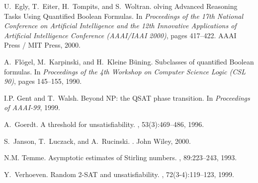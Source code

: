 \documentclass[aop,noinfoline]{imsart}
\begin{document}
\begin{thebibliography}{10}
U.~Egly, T.~Eiter, H.~Tompits, and S.~Woltran.
olving {A}dvanced {R}easoning {T}asks {U}sing {Q}uantified
  {B}oolean {F}ormulas.
\newblock In {\em Proceedings of the 17th National Conference on Artificial
  Intelligence and the 12th Innovative Applications of Artificial Intelligence
  Conference (AAAI/IAAI 2000)}, pages 417--422. AAAI Press / MIT Press, 2000.

A.~Fl{\"o}gel, M.~Karpinski, and H.~Kleine B{\"u}ning.
\newblock Subclasses of quantified {B}oolean formulas.
\newblock In {\em Proceedings of the 4th Workshop on Computer Science Logic
  (CSL 90)}, pages 145--155, 1990.

I.P. Gent and T.~Walsh.
\newblock Beyond {NP}: the {QSAT} phase transition.
\newblock In {\em Proceedings of AAAI-99}, 1999.

A.~Goerdt.
\newblock A threshold for unsatisfiability.
, 53(3):469--486,
  1996.

S.~Janson, T.~Luczack, and A.~Rucinski.
.
\newblock John Wiley, 2000.

N.M. Temme.
\newblock Asymptotic estimates of {S}tirling numbers.
, 89:223--243, 1993.

Y.~Verhoeven.
\newblock Random 2-{SAT} and unsatisfiability.
, 72(3-4):119--123, 1999.

\end{thebibliography}
\end{document}
